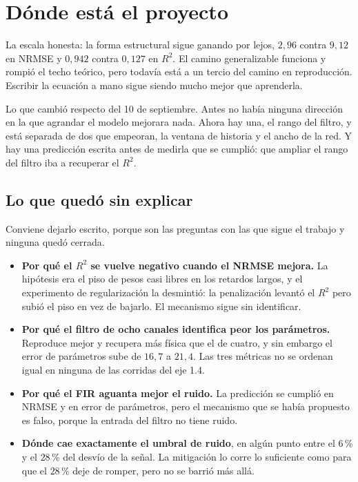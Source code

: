 \documentclass[11pt,a4paper]{article}
\begin{document}
\section{Dónde está el proyecto}

La escala honesta: la forma estructural sigue ganando por lejos, $2{,}96$ contra
$9{,}12$ en NRMSE y $0{,}942$ contra $0{,}127$ en $R^2$. El camino generalizable
funciona y rompió el techo teórico, pero todavía está a un tercio del camino en
reproducción. Escribir la ecuación a mano sigue siendo mucho mejor que
aprenderla.

Lo que cambió respecto del 10 de septiembre. Antes no había ninguna dirección
en la que agrandar el modelo mejorara nada. Ahora hay una, el rango del filtro,
y está separada de dos que empeoran, la ventana de historia y el ancho de la
red. Y hay una predicción escrita antes de medirla que se cumplió: que ampliar
el rango del filtro iba a recuperar el $R^2$.

\subsection{Lo que quedó sin explicar}

Conviene dejarlo escrito, porque son las preguntas con las que sigue el trabajo
y ninguna quedó cerrada.

\begin{itemize}
\item \textbf{Por qué el $R^2$ se vuelve negativo cuando el NRMSE mejora.} La
  hipótesis era el piso de pesos casi libres en los retardos largos, y el
  experimento de regularización la desmintió: la penalización levantó el $R^2$
  pero subió el piso en vez de bajarlo. El mecanismo sigue sin identificar.
\item \textbf{Por qué el filtro de ocho canales identifica peor los
  parámetros.} Reproduce mejor y recupera más física que el de cuatro, y sin
  embargo el error de parámetros sube de $16{,}7$ a $21{,}4$. Las tres métricas
  no se ordenan igual en ninguna de las corridas del eje 1.4.
\item \textbf{Por qué el FIR aguanta mejor el ruido.} La predicción se cumplió
  en NRMSE y en error de parámetros, pero el mecanismo que se había propuesto es
  falso, porque la entrada del filtro no tiene ruido.
\item \textbf{Dónde cae exactamente el umbral de ruido}, en algún punto entre el
  $6\,\%$ y el $28\,\%$ del desvío de la señal. La mitigación lo corre lo
  suficiente como para que el $28\,\%$ deje de romper, pero no se barrió más
  allá.
\end{itemize}
\end{document}
